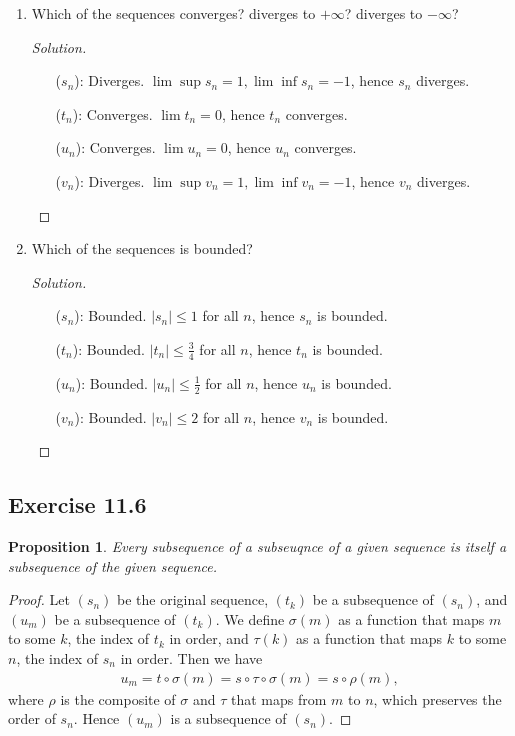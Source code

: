 \documentclass{article}
\newtheorem{proposition}[thm]{Proposition}
\begin{document}
\begin{enumerate}[label=(\alph*)]
    \item Which of the sequences converges? diverges to $+\infty$? diverges to $-\infty$?
    \begin{proof}[Solution]\indent
        \begin{enumerate}
            \item[($s_n$):] Diverges. $\lim \sup s_n = 1, \lim \inf s_n = -1$, hence $s_n$ diverges.
            \item[($t_n$):] Converges. $\lim t_n = 0$, hence $t_n$ converges.
            \item[($u_n$):] Converges. $\lim u_n = 0$, hence $u_n$ converges.
            \item[($v_n$):] Diverges. $\lim \sup v_n=1, \lim\inf v_n=-1$, hence $v_n$ diverges.
        \end{enumerate}
    \end{proof}

    \item Which of the sequences is bounded?
    \begin{proof}[Solution]\indent
        \begin{enumerate}
            \item[($s_n$):] Bounded. $|s_n|\leq 1$ for all $n$, hence $s_n$ is bounded.
            \item[($t_n$):] Bounded. $|t_n|\leq \frac{3}{4}$ for all $n$, hence $t_n$ is bounded.
            \item[($u_n$):] Bounded. $|u_n|\leq \frac{1}{2}$ for all $n$, hence $u_n$ is bounded.
            \item[($v_n$):] Bounded. $|v_n|\le 2$ for all $n$, hence $v_n$ is bounded.
        \end{enumerate}
    \end{proof}
\end{enumerate}

\subsection*{Exercise 11.6}
\begin{proposition}
    Every subsequence of a subseuqnce of a given sequence is itself a subsequence of the given 
    sequence. 
\end{proposition}
\begin{proof}
    Let $(s_n)$ be the original sequence, $(t_k)$ be a subsequence of $(s_n)$, and $(u_m)$ be a 
    subsequence of $(t_k)$. We define $\sigma(m)$ as a function that maps $m$ to some $k$, the index 
    of $t_k$ in order, and $\tau(k)$ as a function that maps $k$ to some $n$, the index of $s_n$ in
    order. Then we have
    \begin{align*}
        u_m = t \circ \sigma(m) = s \circ \tau \circ \sigma(m) = s \circ \rho(m),
    \end{align*}
    where $\rho$ is the composite of $\sigma$ and $\tau$ that maps from $m$ to $n$, which preserves 
    the order of $s_n$. Hence $(u_m)$ is a subsequence of $(s_n)$.
\end{proof}
\end{document}
